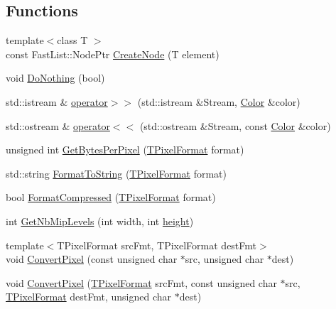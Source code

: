 \subsection*{Functions}
\begin{DoxyCompactItemize}
\item 
{\footnotesize template$<$class T $>$ }\\const Fast\+List\+::\+Node\+Ptr \hyperlink{namespace_agmd_utilities_ab6e7e1345c2f717abad3d9d63b283dfe}{Create\+Node} (T element)
\item 
void \hyperlink{namespace_agmd_utilities_ab9f8152fd02f659830118a6a2c1efb18}{Do\+Nothing} (bool)
\item 
std\+::istream \& \hyperlink{namespace_agmd_utilities_a84800be2de30376d28d7e09f751b7b9f}{operator$>$$>$} (std\+::istream \&Stream, \hyperlink{class_agmd_utilities_1_1_color}{Color} \&color)
\item 
std\+::ostream \& \hyperlink{namespace_agmd_utilities_a09ec693f0cbaeff9277481ac0bc3a5ea}{operator$<$$<$} (std\+::ostream \&Stream, const \hyperlink{class_agmd_utilities_1_1_color}{Color} \&color)
\item 
unsigned int \hyperlink{namespace_agmd_utilities_a2652f08860fb5eb126af8afd4245b96a}{Get\+Bytes\+Per\+Pixel} (\hyperlink{namespace_agmd_afc48fd9fa5dccb4c5621c052bfd1a7ec}{T\+Pixel\+Format} format)
\item 
std\+::string \hyperlink{namespace_agmd_utilities_af4b737723de85a01ece1c8132702c087}{Format\+To\+String} (\hyperlink{namespace_agmd_afc48fd9fa5dccb4c5621c052bfd1a7ec}{T\+Pixel\+Format} format)
\item 
bool \hyperlink{namespace_agmd_utilities_a0ef9d8cf9651a97a42326edc2f6e1c52}{Format\+Compressed} (\hyperlink{namespace_agmd_afc48fd9fa5dccb4c5621c052bfd1a7ec}{T\+Pixel\+Format} format)
\item 
int \hyperlink{namespace_agmd_utilities_abbfb5d5d6e22b6414f443cfffd0307ce}{Get\+Nb\+Mip\+Levels} (int width, int \hyperlink{_examples_2_bezier_2_app_8cpp_a48083b65ac9a863566dc3e3fff09a5b4}{height})
\item 
{\footnotesize template$<$T\+Pixel\+Format src\+Fmt, T\+Pixel\+Format dest\+Fmt$>$ }\\void \hyperlink{namespace_agmd_utilities_a869c26bd9d35ce976f114f571ef0b8a4}{Convert\+Pixel} (const unsigned char $\ast$src, unsigned char $\ast$dest)
\item 
void \hyperlink{namespace_agmd_utilities_a61d9139cffabff4f575d8c84db52cf60}{Convert\+Pixel} (\hyperlink{namespace_agmd_afc48fd9fa5dccb4c5621c052bfd1a7ec}{T\+Pixel\+Format} src\+Fmt, const unsigned char $\ast$src, \hyperlink{namespace_agmd_afc48fd9fa5dccb4c5621c052bfd1a7ec}{T\+Pixel\+Format} dest\+Fmt, unsigned char $\ast$dest)

\end{DoxyCompactItemize}
